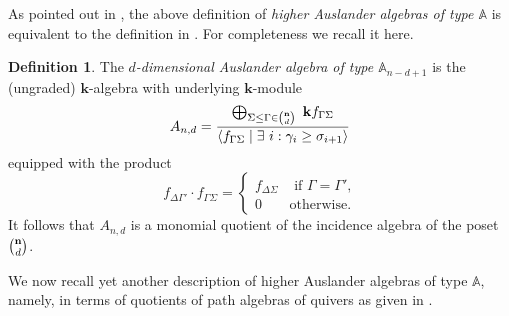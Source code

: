 \documentclass{amsart}
\newcommand{\A}{\mathbb{A}}
\newcommand{\bk}{\mathbf{k}}
\theoremstyle{plain}
\theoremstyle{definition}
\newtheorem{Def}[Thm]{Definition}
\numberwithin{equation}{section}
\begin{document}
As pointed out in \cite{DyckerhoffJassoLekili21}, the above definition of {\it higher Auslander algebras of type $\A$} is equivalent to the definition in \cite{OppermannThomas12}. For completeness we recall it here. 

\begin{Def}\label{def2}
    The {\it $d$-dimensional Auslander algebra of type $\A_{n-d+1}$} is the (ungraded) $\bk$-algebra with underlying $\bk$-module 
    \begin{equation}
        A_{n,d}=\frac{\bigoplus_{\Sigma\le\Gamma\in\binom{\bf n}{d}}\ \bk f_{\Gamma\Sigma}}{\langle f_{\Gamma\Sigma}\mid \exists\ i:\gamma_i\ge \sigma_{i+1} \rangle}
    \end{equation}
    equipped with the product \[ f_{\Delta\Gamma'}\cdot f_{\Gamma\Sigma}=\begin{cases}
    f_{\Delta\Sigma} & \text{ if $\Gamma=\Gamma'$,}\\ 0 & \text{otherwise.}
\end{cases}\]
It follows that $A_{n,d}$ is a monomial quotient of the incidence algebra of the poset $\binom{\bf n}{d}$.
\end{Def}

We now recall yet another description of higher Auslander algebras of type $\mathbb{A}$, namely, in terms of quotients of path algebras of quivers as given in \cite{HerschendJorgensen21}. 
\end{document}
